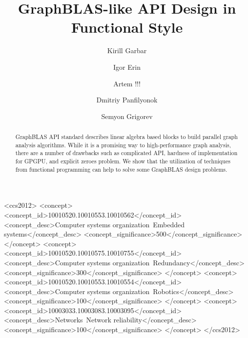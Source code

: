 \documentclass[sigplan,screen]{acmart}
\begin{document}
\title{GraphBLAS-like API Design in Functional Style}

\author{Kirill Garbar}
\author{Igor Erin}
\author{Artem !!!}
\email{!!!}
\author{Dmitriy Panfilyonok}
\author{Semyon Grigorev}


\renewcommand{\shortauthors}{dgdgdg}



\begin{abstract}
    GraphBLAS API standard describes linear algebra based blocks to build parallel graph analysis algorithms.
    While it is a promising way to high-performance graph analysis, there are a number of drawbacks such as complicated API, hardness of implementation for GPGPU, and explicit zeroes problem.
    We show that the utilization of techniques from functional programming can help to solve some GraphBLAS design problems.
\end{abstract}

\begin{CCSXML}
<ccs2012>
 <concept>
  <concept_id>10010520.10010553.10010562</concept_id>
  <concept_desc>Computer systems organization~Embedded systems</concept_desc>
  <concept_significance>500</concept_significance>
 </concept>
 <concept>
  <concept_id>10010520.10010575.10010755</concept_id>
  <concept_desc>Computer systems organization~Redundancy</concept_desc>
  <concept_significance>300</concept_significance>
 </concept>
 <concept>
  <concept_id>10010520.10010553.10010554</concept_id>
  <concept_desc>Computer systems organization~Robotics</concept_desc>
  <concept_significance>100</concept_significance>
 </concept>
 <concept>
  <concept_id>10003033.10003083.10003095</concept_id>
  <concept_desc>Networks~Network reliability</concept_desc>
  <concept_significance>100</concept_significance>
 </concept>
</ccs2012>
\end{CCSXML}
  
\end{document}
